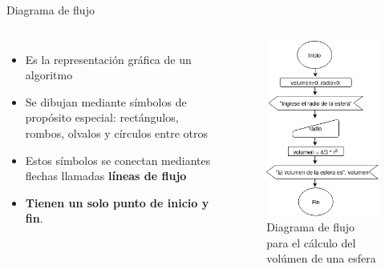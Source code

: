 \documentclass[xcolor=pdftex,table,11pt]{beamer}
\begin{document}
\begin{frame}{Diagrama de flujo}
\begin{columns}
 \begin{itemize}
   
     	\item<1-> Es la representación gráfica de un algoritmo
        \item<2-> Se dibujan mediante símbolos de propósito especial: rectángulos, rombos, olvalos y círculos entre otros
 		\item<3-> Estos símbolos se conectan mediantes flechas llamadas \textbf{líneas de flujo}
 		\item<4-> \textbf{Tienen un solo punto de inicio y fin}.
   \end{itemize}
 \begin{figure}
\includegraphics[scale=0.4]{../img/exported/volumen_esfera.png}
\caption{Diagrama de flujo para el cálculo del volúmen de una esfera}
\end{figure}
\end{columns}
\end{frame}
\end{document}
